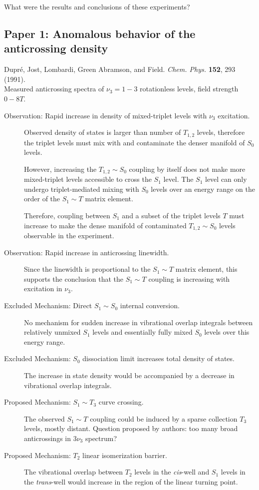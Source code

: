 \message{ !name(chapter1-introduction.tex)}\documentclass[12pt]{mitthesis}
\begin{document}
What were the results and conclusions of these experiments?

\subsection{Paper 1: Anomalous behavior of the anticrossing density}

Dupr\'{e}, Jost, Lombardi, Green Abramson, and Field.
\emph{Chem. Phys.}  \textbf{152}, 293 (1991).\\
Measured anticrossing spectra of $\nu_3=1-3$ rotationless levels,
field strength $0-8T$.

\begin{description}
\item[Observation: Rapid increase in density of mixed-triplet levels
  with $\nu_3$ excitation.]  Observed density of states is larger than
  number of $T_{1,2}$ levels, therefore the triplet levels must mix
  with and contaminate the denser manifold of $S_0$ levels.

  However, increasing the $T_{1,2} \sim S_0$ coupling by itself does
  not make more mixed-triplet levels accessible to cross the $S_1$
  level.  The $S_1$ level can only undergo triplet-mediated mixing
  with $S_0$ levels over an energy range on the order of the $S_1 \sim
  T$ matrix element.

  Therefore, coupling between $S_1$ and a subset of the triplet levels
  $T$ must increase to make the dense manifold of contaminated
  $T_{1,2} \sim S_0$ levels observable in the experiment.

\item[Observation: Rapid increase in anticrossing linewidth.]  Since
  the linewidth is proportional to the $S_1 \sim T$ matrix element,
  this supports the conclusion that the $S_1 \sim T$ coupling is
  increasing with excitation in $\nu_3$.

\item[Excluded Mechanism: Direct $S_1 \sim S_0$ internal conversion.]
  No mechanism for sudden increase in vibrational overlap integrals
  between relatively unmixed $S_1$ levels and essentially fully mixed
  $S_0$ levels over this energy range.

\item[Excluded Mechanism: $S_0$ dissociation limit increases total
  density of states.]  The increase in state density would be
  accompanied by a decrease in vibrational overlap integrals.

\item[Proposed Mechanism: $S_1 \sim T_3$ curve crossing.]  The
  observed $S_1 \sim T$ coupling could be induced by a sparse
  collection $T_3$ levels, mostly distant.  Question proposed by
  authors: too many broad anticrossings in $3\nu_3$ spectrum?

\item[Proposed Mechanism: $T_2$ linear isomerization barrier.]  The
  vibrational overlap between $T_2$ levels in the \emph{cis}-well and
  $S_1$ levels in the \emph{trans}-well would increase in the region
  of the linear turning point.
\end{description}
\end{document}
